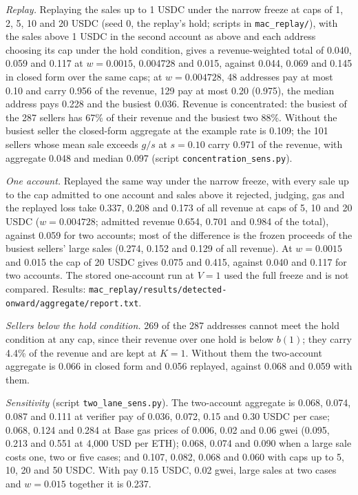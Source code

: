 \documentclass[10pt,a4paper]{article}
\theoremstyle{plain}
\theoremstyle{remark}
\begin{document}
\emph{Replay.} Replaying the sales up to 1 USDC under the narrow freeze at caps of 1, 2, 5, 10 and 20 USDC (seed 0, the replay's hold; scripts in \texttt{mac\_replay/}), with the sales above 1 USDC in the second account as above and each address choosing its cap under the hold condition, gives a revenue-weighted total of 0.040, 0.059 and 0.117 at $w=0.0015$, 0.004728 and 0.015, against 0.044, 0.069 and 0.145 in closed form over the same caps; at $w=0.004728$, 48 addresses pay at most 0.10 and carry 0.956 of the revenue, 129 pay at most 0.20 (0.975), the median address pays 0.228 and the busiest 0.036. Revenue is concentrated: the busiest of the 287 sellers has 67\% of their revenue and the busiest two 88\%. Without the busiest seller the closed-form aggregate at the example rate is 0.109; the 101 sellers whose mean sale exceeds $g/s$ at $s=0.10$ carry 0.971 of the revenue, with aggregate 0.048 and median 0.097 (script \texttt{concentration\_sens.py}).

\emph{One account.} Replayed the same way under the narrow freeze, with every sale up to the cap admitted to one account and sales above it rejected, judging, gas and the replayed loss take 0.337, 0.208 and 0.173 of all revenue at caps of 5, 10 and 20 USDC ($w=0.004728$; admitted revenue 0.654, 0.701 and 0.984 of the total), against 0.059 for two accounts; most of the difference is the frozen proceeds of the busiest sellers' large sales (0.274, 0.152 and 0.129 of all revenue). At $w=0.0015$ and 0.015 the cap of 20 USDC gives 0.075 and 0.415, against 0.040 and 0.117 for two accounts. The stored one-account run at $V=1$ used the full freeze and is not compared. Results: \texttt{mac\_replay/results/detected-onward/aggregate/report.txt}.

\emph{Sellers below the hold condition.} 269 of the 287 addresses cannot meet the hold condition at any cap, since their revenue over one hold is below $b(1)$; they carry 4.4\% of the revenue and are kept at $K=1$. Without them the two-account aggregate is 0.066 in closed form and 0.056 replayed, against 0.068 and 0.059 with them.

\emph{Sensitivity} (script \texttt{two\_lane\_sens.py}). The two-account aggregate is 0.068, 0.074, 0.087 and 0.111 at verifier pay of 0.036, 0.072, 0.15 and 0.30 USDC per case; 0.068, 0.124 and 0.284 at Base gas prices of 0.006, 0.02 and 0.06 gwei (0.095, 0.213 and 0.551 at 4,000 USD per ETH); 0.068, 0.074 and 0.090 when a large sale costs one, two or five cases; and 0.107, 0.082, 0.068 and 0.060 with caps up to 5, 10, 20 and 50 USDC. With pay 0.15 USDC, 0.02 gwei, large sales at two cases and $w=0.015$ together it is 0.237.
\end{document}
